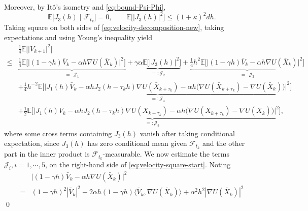\documentclass[12pt]{article}
\numberwithin{equation}{section}
\renewenvironment{proof}%
  {\begin{trivlist}%
   \item[]\ignorespaces}%
  {\qed\end{trivlist}}
\begin{document}
\begin{proof}
Moreover, by It\^o's isometry and \eqref{eq:bound-Psi-Phi},
\begin{equation}
\label{eq:velocity-I3-bound}
\mathbb{E}
\big[
J_3(h)
\mid
\mathcal F_{t_k}
\big]
=0,
\qquad
\mathbb{E}
\Big[
\big|
J_3(h)
\big|^2
\Big]
\leq
(1+\kappa)^2dh.
\end{equation}
%
Taking square on both sides of \eqref{eq:velocity-decomposition-new}, taking expectations and using Young's inequality yield
\begin{equation}
\label{eq:velocity-square-start}
\begin{aligned}
&
\tfrac{1}{4}
\mathbb{E}
\Big[
\big|
\bar{V}_{k+1}
\big|^2
\Big]
\\ 
\leq&
\underbrace{
\tfrac{1}{4}
\mathbb{E}
\Big[
\big|
(1-\gamma h)\bar{V}_k
-
\alpha h\nabla U(\bar{X}_k)
\big|^2
\Big]
}_{=:\mathcal J_1}
+
\underbrace{
\gamma  \alpha
\mathbb{E}
\Big[
\big|
J_3(h)
\big|^2
\Big]
}_{=:\mathcal J_2}
+
\underbrace{
\tfrac{1}{4}h^2
\mathbb{E}
\Big[
\big|
(1-\gamma h)\bar{V}_k
-
\alpha h\nabla U(\bar{X}_k)
\big|^2
\Big]
}_{=:\mathcal J_3}
\\
&+
\underbrace{
\tfrac{1}{4}h^{-2}
\mathbb{E}
\Big[
\big|
J_1(h)\bar{V}_k
-
\alpha hJ_2(h-\tau_kh)
\nabla U(\bar{X}_{k+\tau_k})
-
\alpha h
\big(
\nabla U(\bar{X}_{k+\tau_k})
-
\nabla U(\bar{X}_k)
\big)
\big|^2
\Big]
}_{=:\mathcal J_4}
\\
&+
\underbrace{
\tfrac{1}{2}
\mathbb{E}
\Big[
\big|
J_1(h)\bar{V}_k
-
\alpha hJ_2(h-\tau_kh)
\nabla U(\bar{X}_{k+\tau_k})
-
\alpha h
\big(
\nabla U(\bar{X}_{k+\tau_k})
-
\nabla U(\bar{X}_k)
\big)
\big|^2
\Big]
}_{=:\mathcal J_5}
,
\end{aligned}
\end{equation}
where some cross terms containing $J_3(h)$ vanish after taking conditional expectation, since $J_3(h)$ has zero conditional mean given $\mathcal F_{t_k}$ and the other part in the inner product is $\mathcal F_{t_k}$-measurable.
%
We now estimate the terms $\mathcal J_i,i=1,\cdots,5$, on the right-hand side of \eqref{eq:velocity-square-start}. 
Noting
\begin{equation}
\label{eq:velocity-leading-expand}
\begin{aligned}
&
\big|
(1-\gamma h)\bar{V}_k
-
\alpha h\nabla U(\bar{X}_k)
\big|^2
\\
=&
(1-\gamma h)^2
|\bar{V}_k|^2
-
2\alpha h(1-\gamma h)
\big\langle
\bar{V}_k,
\nabla U(\bar{X}_k)
\big\rangle
+
\alpha^2h^2
|\nabla U(\bar{X}_k)|^2
\end{aligned}

\end{equation}
\end{proof}
\end{document}
